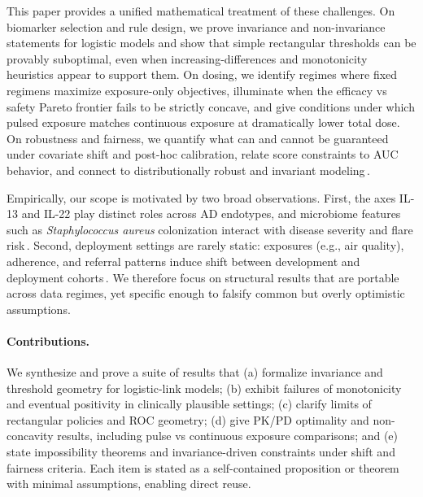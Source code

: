 \documentclass[11pt]{article}
\numberwithin{equation}{section}
\theoremstyle{plain}
\theoremstyle{definition}
\theoremstyle{remark}
\begin{document}
This paper provides a unified mathematical treatment of these challenges. On biomarker selection and rule design, we prove invariance and non-invariance statements for logistic models and show that simple rectangular thresholds can be provably suboptimal, even when increasing-differences and monotonicity heuristics appear to support them. On dosing, we identify regimes where fixed regimens maximize exposure-only objectives, illuminate when the efficacy vs safety Pareto frontier fails to be strictly concave, and give conditions under which pulsed exposure matches continuous exposure at dramatically lower total dose. On robustness and fairness, we quantify what can and cannot be guaranteed under covariate shift and post-hoc calibration, relate score constraints to AUC behavior, and connect to distributionally robust and invariant modeling\,\cite{DatasetShift2008,BenDavidEtAl2010,EsfahaniKuhn2018,ArjovskyIRM2019,HardtEquality2016}.

Empirically, our scope is motivated by two broad observations. First, the axes IL-13 and IL-22 play distinct roles across AD endotypes, and microbiome features such as \emph{Staphylococcus aureus} colonization interact with disease severity and flare risk\,\cite{HuangBleach2011}. Second, deployment settings are rarely static: exposures (e.g., air quality), adherence, and referral patterns induce shift between development and deployment cohorts\,\cite{DatasetShift2008}. We therefore focus on structural results that are portable across data regimes, yet specific enough to falsify common but overly optimistic assumptions.

\paragraph{Contributions.} We synthesize and prove a suite of results that (a) formalize invariance and threshold geometry for logistic-link models; (b) exhibit failures of monotonicity and eventual positivity in clinically plausible settings; (c) clarify limits of rectangular policies and ROC geometry; (d) give PK/PD optimality and non-concavity results, including pulse vs continuous exposure comparisons; and (e) state impossibility theorems and invariance-driven constraints under shift and fairness criteria. Each item is stated as a self-contained proposition or theorem with minimal assumptions, enabling direct reuse.
\end{document}
